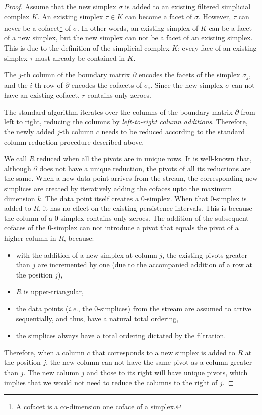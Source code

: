 \documentclass[11pt]{article}
\begin{document}
\begin{proof}
	
	Assume that the new simplex $\sigma$ is added to an existing filtered simplicial complex $K$.  
	An existing simplex $\tau \in K$ can become a facet of $\sigma$.  However, $\tau$ can never be 
	a cofacet\footnote{A cofacet is a co-dimension one coface of a simplex.} of $\sigma$.  In other 
	words, an existing simplex of $K$ can be a facet of a new simplex, but the new simplex can not 
	be a facet of an existing simplex.  This is due to the definition of the simplicial complex 
	$K$: every face of an existing simplex $\tau$ must already be contained in $K$.
	
	The $j$-th column of the boundary matrix $\partial$ encodes the facets of the simplex 
	$\sigma_j$, and the $i$-th row of $\partial$ encodes the cofacets of $\sigma_i$.  Since the new 
	simplex $\sigma$ can not have an existing cofacet, $r$ contains only zeroes.
	
	
	The standard algorithm iterates over the columns of the boundary matrix $\partial$ from left to 
	right, reducing the columns by \emph{left-to-right column additions}.  Therefore, the newly 
	added $j$-th column $c$ needs to be reduced according to the standard column reduction 
	procedure described above.
	
	
	We call $R$ reduced when all the pivots are in unique rows.  It is well-known that, although 
	$\partial$ does not have a unique reduction, the pivots of all its reductions are the same.  
	When a new data point arrives from the stream, the corresponding new simplices are created by 
	iteratively adding the cofaces upto the maximum dimension $k$.  The data point itself creates a 
	$0$-simplex.  When that $0$-simplex is added to $R$, it has no effect on the existing 
	persistence 
	intervals.  This is because the column of a $0$-simplex contains only zeroes.  The addition of 
	the subsequent cofaces of the $0$-simplex can not introduce a pivot that equals the pivot of a 
	higher column in $R$, because:
	
	
	\begin{itemize}
		\item with the addition of a new simplex at column $j$, the existing pivots greater than 
		$j$ are incremented by one (due to the accompanied addition of a row at the position $j$),
		\item $R$ is upper-triangular,
		\item the data points (\textit{i.e.}, the $0$-simplices) from the stream are assumed to 
		arrive sequentially, and thus, have a natural total ordering,
		\item the simplices always have a total ordering dictated by the filtration.
	\end{itemize}
	
	
	Therefore, when a column $c$ that corresponds to a new simplex is added to $R$ at the position 
	$j$, the new column can not have the same pivot as a column greater than $j$.  The new column 
	$j$ and those to its right will have unique pivots, which implies that we would not need to 
	reduce the columns to the right of $j$.	
	
\end{proof}
\end{document}
